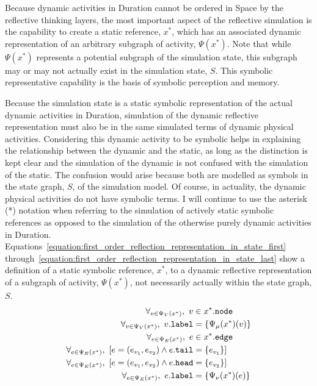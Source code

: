 Because dynamic activities in Duration cannot be ordered in Space by
the reflective thinking layers, the most important aspect of the
reflective simulation is the capability to create a static reference,
$x^*$, which has an associated dynamic representation of an arbitrary
subgraph of activity, $\Psi(x^*)$.  Note that while $\Psi(x^*)$
represents a potential subgraph of the simulation state, this subgraph
may or may not actually exist in the simulation state, $S$.  This
symbolic representative capability is the basis of symbolic perception
and memory.

Because the simulation state is a static symbolic representation of
the actual dynamic activities in Duration, simulation of the dynamic
reflective representation must also be in the same simulated terms of
dynamic physical activities.  Considering this dynamic activity to be
symbolic helps in explaining the relationship between the dynamic and
the static, as long as the distinction is kept clear and the
simulation of the dynamic is not confused with the simulation of the
static.  The confusion would arise because both are modelled as
symbols in the state graph, $S$, of the simulation model.  Of course,
in actuality, the dynamic physical activities do not have symbolic
terms.  I will continue to use the asterisk (*) notation when
referring to the simulation of actively static symbolic references as
opposed to the simulation of the otherwise purely dynamic activities
in Duration.
{\mbox{Equations~\ref{equation:first_order_reflection_representation_in_state_first}}}
{\mbox{through~\ref{equation:first_order_reflection_representation_in_state_last}}}
show a definition of a static symbolic reference, $x^*$, to a dynamic
reflective representation of a subgraph of activity, $\Psi(x^*)$, not
necessarily actually within the state graph, $S$.
\begin{align}
\label{equation:first_order_reflection_representation_in_state_first}
                                                   \forall_{v \in \Psi_V(x^*)}, ~v &\in x^*.\text{\tt{node}} \\
                                 \forall_{v \in \Psi_V(x^*)}, ~v.\text{\tt{label}} &= \{\Psi_\mu(x^*)(v)\} \\
                                                   \forall_{e \in \Psi_E(x^*)}, ~e &\in x^*.\text{\tt{edge}} \\
     \forall_{e \in \Psi_E(x^*)}, ~[e = (e_{v_1}, e_{v_2}) \wedge e.\text{\tt{tail}} &= \{e_{v_1}\}] \\
     \forall_{e \in \Psi_E(x^*)}, ~[e = (e_{v_1}, e_{v_2}) \wedge e.\text{\tt{head}} &= \{e_{v_2}\}] \\
\label{equation:first_order_reflection_representation_in_state_last}
                                 \forall_{e \in \Psi_E(x^*)}, ~e.\text{\tt{label}} &= \{\Psi_\nu(x^*)(e)\}
\end{align}
